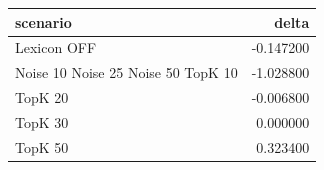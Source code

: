 \begin{tabular}{lr}
\toprule
scenario & delta \\
\midrule
Lexicon OFF & -0.147200 \\
Noise 10%
Noise 25%
Noise 50%
TopK 10 & -1.028800 \\
TopK 20 & -0.006800 \\
TopK 30 & 0.000000 \\
TopK 50 & 0.323400 \\
\bottomrule
\end{tabular}
